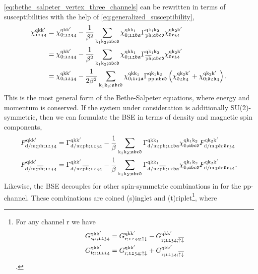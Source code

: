 \documentclass[../../main.tex]{subfiles}
\begin{document}
\eqref{eq:bethe_salpeter_vertex_three_channels} can be rewritten in terms of susceptibilities with the help of \eqref{eq:generalized_susceptibility},
\begin{subequations}
\begin{align}
	\chi^{\text{q}\text{k}\text{k}'}_{\mathfrak{1234}}&=\chi^{\text{q}\text{k}\text{k}'}_{0;\mathfrak{1234}}-\frac{1}{\beta^2}\sum_{\text{k}_1\text{k}_2;\mathfrak{abcd}}\chi^{\text{q}\text{k}\text{k}_1}_{0;\mathfrak{12ba}} \Gamma^{\text{q}\text{k}_1\text{k}_2}_{\text{ph};\mathfrak{abcd}} \chi^{\text{q}\text{k}_2\text{k}'}_{\mathfrak{dc34}}\\
	&=\chi^{\text{q}\text{k}\text{k}'}_{0;\mathfrak{1234}}-\frac{1}{\beta^2}\sum_{\text{k}_1\text{k}_2;\mathfrak{abcd}}\chi^{\text{q}\text{k}\text{k}_1}_{0;\mathfrak{12ba}} \Gamma^{\text{q}\text{k}_1\text{k}_2}_{\overline{\text{ph}};\mathfrak{abcd}} \chi^{\text{q}\text{k}_2\text{k}'}_{\mathfrak{dc34}}\\
	&=\chi^{\text{q}\text{k}\text{k}'}_{0;\mathfrak{1234}}-\frac{1}{2\beta^2}\sum_{\text{k}_1\text{k}_2;\mathfrak{abcd}}\chi^{\text{q}\text{k}\text{k}_1}_{0;\mathfrak{1c3a}}\Gamma^{\text{q}\text{k}_1\text{k}_2}_{\text{pp};\mathfrak{abcd}}\left (\chi^{\text{q}\text{k}_2\text{k}'}_{\mathfrak{d2b4}}+\chi^{\text{q}\text{k}_2\text{k}'}_{0;\mathfrak{d2b4}}\right ).
\end{align}
\end{subequations}
This is the most general form of the Bethe-Salpeter equations, where energy and momentum is conserved. If the system under consideration is additionally SU(2)-symmetric, then we can formulate the BSE in terms of density and magnetic spin components,
\begin{subequations}
\begin{align}
	F_{\text{d}/\text{m};\text{ph};\mathfrak{1234}}^{\text{q}\text{k}\text{k}'}&=\Gamma_{\text{d}/\text{m};\text{ph};\mathfrak{1234}}^{\text{q}\text{k}\text{k}'}-\frac1\beta\sum_{\text{k}_1\text{k}_2;\mathfrak{abcd}} \Gamma_{\text{d}/\text{m};\text{ph};\mathfrak{12ba}}^{\text{q}\text{k}\text{k}_1} \chi_{0;\mathfrak{abcd}}^{\text{q}\text{k}_1\text{k}_2} F_{\text{d}/\text{m};\text{ph};\mathfrak{dc34}}^{\text{q}\text{k}_2\text{k}'}\\
	F_{\text{d}/\text{m};\overline{\text{ph}};\mathfrak{1234}}^{\text{q}\text{k}\text{k}'}&=\Gamma_{\text{d}/\text{m};\overline{\text{ph}};\mathfrak{1234}}^{\text{q}\text{k}\text{k}'}-\frac1\beta\sum_{\text{k}_1\text{k}_2;\mathfrak{abcd}} \Gamma_{\text{d}/\text{m};\overline{\text{ph}};\mathfrak{12ba}}^{\text{q}\text{k}\text{k}_1} \chi_{0;\mathfrak{abcd}}^{\text{q}\text{k}_1\text{k}_2} F_{\text{d}/\text{m};\text{ph};\mathfrak{dc34}}^{\text{q}\text{k}_2\text{k}'}.
\end{align}
\end{subequations}
Likewise, the BSE decouples for other spin-symmetric combinations in for the pp-channel. These combinations are coined (s)inglet and (t)riplet\footnote{
For any channel r we have
\begin{subequations}
\begin{align}
	G^{\text{q}\text{k}\text{k}'}_{\text{s};\text{r};\mathfrak{1234}}&=G^{\text{q}\text{k}\text{k}'}_{\text{r};\mathfrak{1234};\uparrow\downarrow}-G^{\text{q}\text{k}\text{k}'}_{\text{r};\mathfrak{1234};\overline{\uparrow\downarrow}}\\
	G^{\text{q}\text{k}\text{k}'}_{\text{t};\text{r};\mathfrak{1234}}&=G^{\text{q}\text{k}\text{k}'}_{\text{r};\mathfrak{1234};\uparrow\downarrow}+G^{\text{q}\text{k}\text{k}'}_{\text{r};\mathfrak{1234};\overline{\uparrow\downarrow}}
\end{align}
\end{subequations}.}, where
\end{document}
